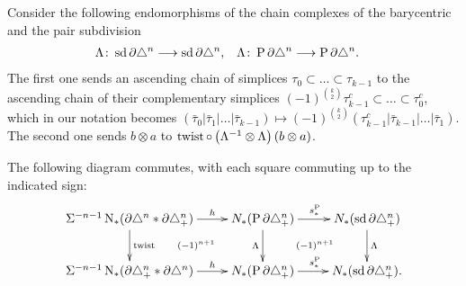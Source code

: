 Consider the following endomorphisms of the chain complexes of the barycentric and the pair subdivision
\begin{align*}
	\Lambda\colon \operatorname{sd} \partial\triangle^n&\longrightarrow \operatorname{sd} \partial\triangle^n,
	&
	\Lambda\colon \operatorname{P} \partial\triangle^n&\longrightarrow \operatorname{P} \partial\triangle^n.
\end{align*}
The first one sends an ascending chain of simplices $\tau_0\subset \ldots\subset \tau_{k-1}$ to the ascending chain of their complementary simplices $(-1)^{\binom{k}{2}} \tau_{k-1}^c\subset \ldots\subset\tau_0^c$, which in our notation becomes $(\bar{\tau}_0|\bar{\tau}_1|\ldots|\bar{\tau}_{k-1})\mapsto (-1)^{\binom{k}{2}}(\tau_{k-1}^c|\bar{\tau}_{k-1}|\ldots|\bar{\tau}_1)$. The second one sends $b\otimes a$ to $\operatorname{twist}\circ \left(\Lambda^{-1}\otimes \Lambda\right)(b\otimes a)$.
\begin{lemma} The following diagram commutes, with each square commuting up to the indicated sign:
	\begin{equation}\label{diag:newdiag}
	\xymatrix{
		\susp{-n-1}\chains(\partial \simplex^n*\partial\asimplex^n)\ar[r]^-h\ar[d]^{\twist} \ar@{}[dr] | {(-1)^{n+1}}&\cadenas(\Psd \partial \asimplex^n) \ar[r]^{s_*^{\Psd}}\ar[d]_{\alex}  \ar@{}[dr] | {(-1)^{n+1}}& \cadenas(\sd \partial \asimplex^n)\ar[d]^{\alex}\\
		\susp{-n-1}\chains(\partial \asimplex^n*\partial\simplex^n)\ar[r]^-h &\cadenas(\Psd \partial \asimplex^n) \ar[r]^{s_*^{\Psd}}& \cadenas(\sd \partial \asimplex^n).
	}
	\end{equation}
\end{lemma}
